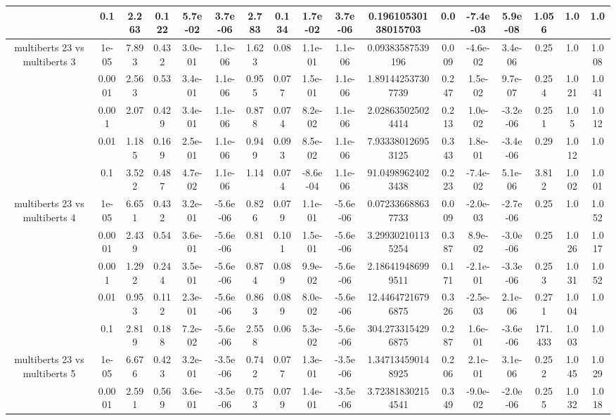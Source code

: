 \begin{tabular}{|c|c|c|c|c|c|c|c|c|c|c|c|c|c|c|c|c|}
 & 0.1 & 2.263 & 0.122 & 5.7e-02 & 3.7e-06 & 2.783 & 0.134 & 1.7e-02 & 3.7e-06 & 0.19610530138015703 & 0.0 & -7.4e-03 & 5.9e-08 & 1.056 & 1.0 & 1.0 \\
\hline
\multirow{5}{*}{multiberts 23 vs multiberts 3} & 1e-05 & 7.893 & 0.432 & 3.0e-01 & 1.1e-06 & 1.623 & 0.08 & 1.1e-01 & 1.1e-06 & 0.09383587539196 & 0.009 & -4.6e-02 & 3.4e-06 & 0.25 & 1.0 & 1.008 \\
 & 0.0001 & 2.563 & 0.53 & 3.4e-01 & 1.1e-06 & 0.955 & 0.077 & 1.5e-01 & 1.1e-06 & 1.891442537307739 & 0.247 & 1.5e-02 & 9.7e-07 & 0.254 & 1.021 & 1.041 \\
 & 0.001 & 2.07 & 0.429 & 3.4e-01 & 1.1e-06 & 0.878 & 0.074 & 8.2e-02 & 1.1e-06 & 2.028635025024414 & 0.213 & 1.0e-02 & -3.2e-06 & 0.251 & 1.05 & 1.012 \\
 & 0.01 & 1.185 & 0.169 & 2.5e-01 & 1.1e-06 & 0.949 & 0.093 & 8.5e-02 & 1.1e-06 & 7.933380126953125 & 0.343 & 1.8e-01 & -3.4e-06 & 0.29 & 1.012 & 1.0 \\
 & 0.1 & 3.522 & 0.487 & 4.7e-02 & 1.1e-06 & 1.14 & 0.074 & -8.6e-04 & 1.1e-06 & 91.04989624023438 & 0.223 & -7.4e-02 & 5.1e-06 & 3.812 & 1.002 & 1.001 \\
\hline
\multirow{5}{*}{multiberts 23 vs multiberts 4} & 1e-05 & 6.651 & 0.432 & 3.2e-01 & -5.6e-06 & 0.826 & 0.079 & 1.1e-01 & -5.6e-06 & 0.072336688637733 & 0.009 & -2.0e-03 & -2.7e-06 & 0.25 & 1.0 & 1.052 \\
 & 0.0001 & 2.439 & 0.54 & 3.6e-01 & -5.6e-06 & 0.81 & 0.101 & 1.5e-01 & -5.6e-06 & 3.299302101135254 & 0.387 & 8.9e-02 & -3.0e-06 & 0.25 & 1.026 & 1.017 \\
 & 0.001 & 1.292 & 0.244 & 3.5e-01 & -5.6e-06 & 0.874 & 0.089 & 9.9e-02 & -5.6e-06 & 2.186419486999511 & 0.171 & -2.1e-01 & -3.3e-06 & 0.253 & 1.031 & 1.052 \\
 & 0.01 & 0.953 & 0.112 & 2.3e-01 & -5.6e-06 & 0.863 & 0.089 & 8.0e-02 & -5.6e-06 & 12.44647216796875 & 0.326 & -2.5e-03 & 2.1e-06 & 0.271 & 1.004 & 1.0 \\
 & 0.1 & 2.819 & 0.188 & 7.2e-02 & -5.6e-06 & 2.558 & 0.06 & 5.3e-02 & -5.6e-06 & 304.2733154296875 & 0.287 & 1.6e-01 & -3.6e-06 & 171.433 & 1.003 & 1.0 \\
\hline
\multirow{5}{*}{multiberts 23 vs multiberts 5} & 1e-05 & 6.676 & 0.423 & 3.2e-01 & -3.5e-06 & 0.742 & 0.077 & 1.3e-01 & -3.5e-06 & 1.347134590148925 & 0.206 & 2.1e-01 & 3.1e-06 & 0.252 & 1.045 & 1.029 \\
 & 0.0001 & 2.591 & 0.569 & 3.6e-01 & -3.5e-06 & 0.753 & 0.079 & 1.4e-01 & -3.5e-06 & 3.723818302154541 & 0.349 & -9.0e-02 & -2.0e-06 & 0.255 & 1.032 & 1.018 \\

\end{tabular}
